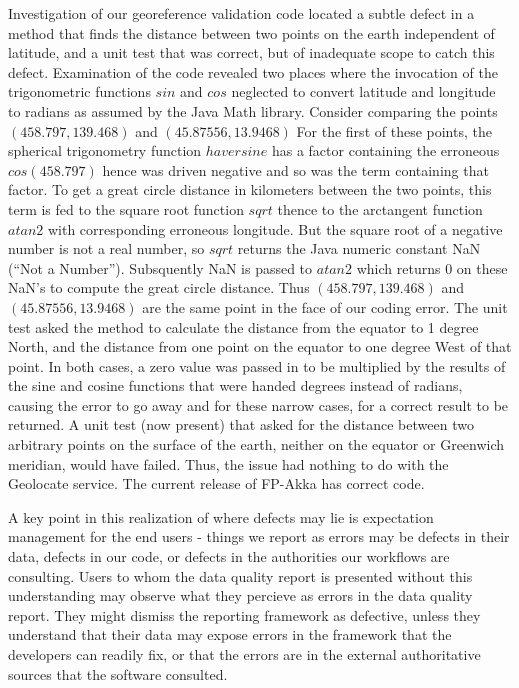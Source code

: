 \documentclass{article}
\begin{document}
Investigation of our georeference validation code located a subtle defect in a method that finds the distance between two points on the earth independent of latitude, and a unit test that was correct, but of inadequate scope to catch this defect.
Examination of the code revealed two places where the invocation of the trigonometric functions $sin$ and $cos$ neglected to convert latitude and longitude to radians as assumed by the Java Math library. 
Consider comparing the points $(458.797,139.468)$ and $(45.87556, 13.9468)$ 
For the first of these points, the spherical trigonometry function $haversine$ has a factor containing the erroneous
$cos(458.797)$ hence was driven negative and so was the term containing that factor. To get a great circle distance in kilometers between the two points, this term is fed to the square root function $sqrt$ thence to the arctangent function $atan2$ with corresponding erroneous longitude. But the square root of a negative number is not a real number, so $sqrt$ returns the Java numeric constant NaN (``Not a Number'').  Subsquently NaN is passed to $atan2$ which returns $0$ on these NaN's to compute the great circle distance.  Thus  $(458.797,139.468)$ and $(45.87556, 13.9468)$ are the same point in the face of our coding error.  The unit test asked the method to calculate the distance from the equator to 1 degree North, and the distance from one point on the equator to one degree West of that point.  In both cases, a zero value was passed in to be multiplied by the results of the sine and cosine functions that were handed degrees instead of radians, causing the error to go away and for these narrow cases, for a correct result to be returned.  A unit test (now present) that asked for the distance between two arbitrary points on the surface of the earth, neither on the equator or Greenwich meridian, would have failed.  Thus, the issue had nothing to do with the Geolocate service. The current release of FP-Akka has correct code.

A key point in this realization of where defects may lie is expectation management for the end users - things we report as errors may be defects in their data, defects in our code, or defects in the authorities our workflows are consulting.  Users to whom the data quality report is presented without this understanding may observe what they percieve as errors in the data quality report. They might dismiss the reporting framework as defective, unless they understand that their data may expose errors in the framework that the developers can readily fix, or that the errors are in the external authoritative sources that the software consulted.  
\end{document}
